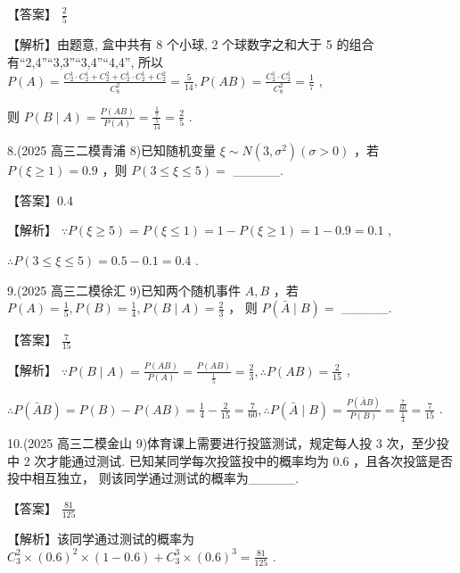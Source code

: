 \documentclass[10pt]{article}
\begin{document}
【答案】 \(\frac{2}{5}\)

【解析】由题意, 盒中共有 8 个小球, 2 个球数字之和大于 5 的组合有“2,4”“3,3”“3,4”“4,4”, 所以 \(P\left( A\right)  = \frac{{C}_{2}^{1} \cdot  {C}_{2}^{1} + {C}_{2}^{2} + {C}_{2}^{1} \cdot  {C}_{2}^{1} + {C}_{2}^{2}}{{C}_{8}^{2}} = \frac{5}{14},P\left( {AB}\right)  = \frac{{C}_{2}^{1} \cdot  {C}_{2}^{1}}{{C}_{8}^{2}} = \frac{1}{7}\) ,

则 \(P\left( {B \mid  A}\right)  = \frac{P\left( {AB}\right) }{P\left( A\right) } = \frac{\frac{1}{7}}{\frac{5}{14}} = \frac{2}{5}\) .

8.(2025 高三二模青浦 8)已知随机变量 \(\xi  \sim  N\left( {3,{\sigma }^{2}}\right) \left( {\sigma  > 0}\right)\) ，若 \(P\left( {\xi  \geq  1}\right)  = {0.9}\) ，则 \(P\left( {3 \leq  \xi  \leq  5}\right)  =\) \_\_\_\_\_.

【答案】0.4

【解析】 \(\because P\left( {\xi  \geq  5}\right)  = P\left( {\xi  \leq  1}\right)  = 1 - P\left( {\xi  \geq  1}\right)  = 1 - {0.9} = {0.1}\) ,

\(\therefore P\left( {3 \leq  \xi  \leq  5}\right)  = {0.5} - {0.1} = {0.4}\) .

9.(2025 高三二模徐汇 9)已知两个随机事件 \(A,B\) ，若 \(P\left( A\right)  = \frac{1}{5},P\left( B\right)  = \frac{1}{4},P\left( {B \mid  A}\right)  = \frac{2}{3}\) ， 则 \(P\left( {\bar{A} \mid  B}\right)  =\) \_\_\_\_\_.

【答案】 \(\frac{7}{15}\)

【解析】 \(\because P\left( {B \mid  A}\right)  = \frac{P\left( {AB}\right) }{P\left( A\right) } = \frac{P\left( {AB}\right) }{\frac{1}{5}} = \frac{2}{3},\therefore P\left( {AB}\right)  = \frac{2}{15}\) ,

\(\therefore P\left( {\bar{A}B}\right)  = P\left( B\right)  - P\left( {AB}\right)  = \frac{1}{4} - \frac{2}{15} = \frac{7}{60},\therefore P\left( {\bar{A} \mid  B}\right)  = \frac{P\left( {\bar{A}B}\right) }{P\left( B\right) } = \frac{\frac{7}{60}}{\frac{1}{4}} = \frac{7}{15}\) .

10.(2025 高三二模金山 9)体育课上需要进行投篮测试，规定每人投 3 次，至少投中 2 次才能通过测试. 已知某同学每次投篮投中的概率均为 0.6 ，且各次投篮是否投中相互独立， 则该同学通过测试的概率为\_\_\_\_\_.

【答案】 \(\frac{81}{125}\)

【解析】该同学通过测试的概率为 \({C}_{3}^{2} \times  {\left( {0.6}\right) }^{2} \times  \left( {1 - {0.6}}\right)  + {C}_{3}^{3} \times  {\left( {0.6}\right) }^{3} = \frac{81}{125}\) .
\end{document}
